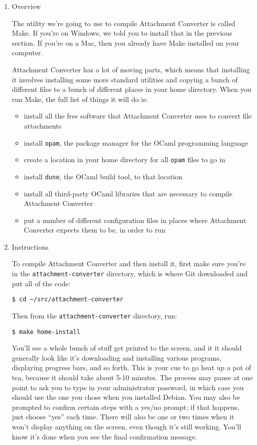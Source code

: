 \documentclass[11pt]{article}
\begin{document}
\begin{enumerate}
\item Overview
\label{sec:orgc149620}

The utility we're going to use to compile Attachment Converter is
called Make.  If you're on Windows, we told you to install that in the
previous section.  If you're on a Mac, then you already have Make
installed on your computer.

Attachment Converter has a lot of moving parts, which means that
installing it involves installing some more standard utilities and
copying a bunch of different files to a bunch of different places in
your home directory.  When you run Make, the full list of things it
will do is:

\begin{itemize}
\item install all the free software that Attachment Converter uses to
convert file attachments
\item install \texttt{opam}, the package manager for the OCaml programming language
\item create a location in your home directory for all \texttt{opam} files to go in
\item install \texttt{dune}, the OCaml build tool, to that location
\item install all third-party OCaml libraries that are necessary to
compile Attachment Converter
\item put a number of different configuration files in places where
Attachment Converter expects them to be, in order to run
\end{itemize}

\item Instructions
\label{sec:orge19aaf3}

To compile Attachment Converter and then install it, first make sure
you're in the \texttt{attachment-converter} directory, which is where Git
downloaded and put all of the code:

\begin{verbatim}
$ cd ~/src/attachment-converter
\end{verbatim}

Then from the \texttt{attachment-converter} directory, run:

\begin{verbatim}
$ make home-install
\end{verbatim}

You'll see a whole bunch of stuff get printed to the screen, and it it
should generally look like it's downloading and installing various
programs, displaying progress bars, and so forth.  This is your cue to
go heat up a pot of tea, because it should take about 5-10 minutes.
The process may pause at one point to ask you to type in your
administrator password, in which case you should use the one you chose
when you installed Debian.  You may also be prompted to confirm
certain steps with a yes/no prompt; if that happens, just choose ``yes''
each time.  There will also be one or two times when it won't display
anything on the screen, even though it's still working.  You'll know
it's done when you see the final confirmation message.


\end{enumerate}
\end{document}
